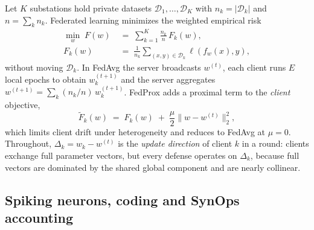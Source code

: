 \documentclass[review,12pt]{elsarticle}
\begin{document}
Let $K$ substations hold private datasets $\mathcal{D}_1,\dots,\mathcal{D}_K$
with $n_k = |\mathcal{D}_k|$ and $n=\sum_k n_k$. Federated learning minimizes
the weighted empirical risk
\begin{equation}
\begin{aligned}
\min_{w}\; F(w) &\;=\; \sum_{k=1}^{K} \frac{n_k}{n}\, F_k(w), \\[2pt]
F_k(w) &\;=\; \frac{1}{n_k}\!\!\sum_{(x,y)\in\mathcal{D}_k}\!\! \ell\!\left(f_w(x), y\right),
\end{aligned}
\label{eq:fedobj}
\end{equation}
without moving $\mathcal{D}_k$. In FedAvg \cite{mcmahan2017} the server
broadcasts $w^{(t)}$, each client runs $E$ local epochs to obtain
$w_k^{(t+1)}$ and the server aggregates
$w^{(t+1)} = \sum_k (n_k/n)\, w_k^{(t+1)}$. FedProx \cite{li2020fedprox}
adds a proximal term to the \emph{client} objective,
\begin{equation}
\tilde{F}_k(w) \;=\; F_k(w) \;+\; \frac{\mu}{2}\bigl\lVert w - w^{(t)}\bigr\rVert_2^2 ,
\label{eq:fedprox}
\end{equation}
which limits client drift under heterogeneity and reduces to FedAvg at
$\mu=0$. Throughout, $\Delta_k = w_k - w^{(t)}$ is the \emph{update
direction} of client $k$ in a round: clients exchange full parameter
vectors, but every defense operates on $\Delta_k$, because full vectors
are dominated by the shared global component and are nearly collinear.

\subsection{Spiking neurons, coding and SynOps accounting}
\label{sec:sup-snn}
\end{document}
